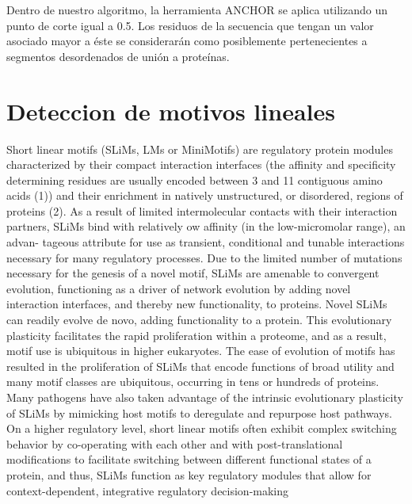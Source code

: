 Dentro de nuestro algoritmo, la herramienta ANCHOR se aplica utilizando un punto de corte igual a 0.5. Los residuos de la secuencia que tengan un valor asociado mayor a 
éste se considerarán como posiblemente pertenecientes a segmentos desordenados de unión a proteínas.   



\section{Deteccion de motivos lineales}


Short linear motifs (SLiMs, LMs or MiniMotifs) are
regulatory protein modules characterized by their
compact interaction interfaces (the affinity and specificity
determining residues are usually encoded between 3 and
11 contiguous amino acids (1)) and their enrichment in
natively unstructured, or disordered, regions of proteins
(2). As a result of limited intermolecular contacts with
their interaction partners, SLiMs bind with relatively
ow affinity (in the low-micromolar range), an advan-
tageous attribute for use as transient, conditional and
tunable interactions necessary for many regulatory
processes. 
Due to the limited number of mutations
necessary for the genesis of a novel motif, SLiMs are
amenable to convergent evolution, functioning as a
driver of network evolution by adding novel interaction
interfaces, and thereby new functionality, to proteins. 
Novel SLiMs can readily evolve de novo, adding functionality to a protein.
This evolutionary plasticity facilitates the rapid proliferation
within a proteome, and as a result, motif use is ubiquitous
in higher eukaryotes.
The ease of evolution of motifs has resulted in the proliferation of
SLiMs that encode functions of broad utility and many
motif classes are ubiquitous, occurring in tens or hundreds
of proteins. Many pathogens have also taken advantage
of the intrinsic evolutionary plasticity of SLiMs by
mimicking host motifs to deregulate and repurpose host
pathways.
On a higher regulatory level, short linear motifs often
exhibit complex switching behavior by co-operating with
each other and with post-translational modifications to
facilitate switching between different functional states of
a protein, and thus, SLiMs function as key regulatory
modules that allow for context-dependent, integrative
regulatory decision-making

